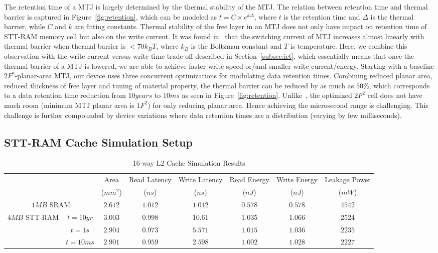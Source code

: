 The retention time of a MTJ is largely determined by the thermal stability of the MTJ. The relation between retention time and thermal barrier is captured in Figure~\ref{fig:retention}, which can be modeled as $t=C\times e^{k\Delta}$, where $t$ is the retention time and $\Delta$ is the thermal barrier, while $C$ and $k$ are fitting constants. Thermal stability of the free layer in an MTJ does not only have impact on retention time of STT-RAM memory cell but also on the write current. It was found in~\cite{PMTJ:Toshiba08} that the switching current of MTJ increases almost linearly with thermal barrier when thermal barrier is $<70k_{B}T$, where $k_{B}$ is the Boltzman constant and $T$ is temperature. Here, we combine this observation with the write current versus write time trade-off described in Section~\ref{subsec:ict}, which essentially means that once the thermal barrier of a MTJ is lowered, we are able to achieve faster write speed or/and smaller write current/energy. Starting with a baseline $2F^2$-planar-area MTJ, our device uses three concurrent optimizations for modulating data retention times. Combining reduced planar area, reduced thickness of free layer and tuning of material property, the thermal barrier can be reduced by as much as $50\%$, which corresponds to a data retention time reduction from $10years$ to $10ms$ as seen in Figure~\ref{fig:retention}. Unlike~\cite{STTRAM:HPCA11}, the optimized $2F^2$ cell does not have much room (minimum MTJ planar area is $1F^2$) for only reducing planar area. Hence achieving the microsecond range is challenging. This challenge is further compounded by device variations where data retention times are a distribution (varying by few milliseconds).

\subsection{STT-RAM Cache Simulation Setup}

\begin{table*}[t]
 \scriptsize
  \centering
  \caption{16-way L2 Cache Simulation Results}
  \label{allcaches}
  \begin{tabular}{| c | c | c | c | c | c | c | c |}
  	\hline\hline
  	\multirow{2}{*}{} & & Area  & Read Latency & Write Latency & Read Energy & Write Energy & Leakage Power\\
  & & ($mm^2$) & ($ns$) & ($ns$) & ($nJ$) & ($nJ$) & ($mW$) \\
  	\hline\hline
  	\multicolumn{2}{|c|}{$1MB$ SRAM} & $2.612$ & $1.012$ & $1.012$ & $0.578$ & $0.578$ & $4542$ \\
  	\hline
  	\multirow{3}{*}{$4MB$ STT-RAM} & $t=10yr$ & $3.003$ & $0.998$ & $10.61$ & $1.035$ & $1.066$ & $2524$ \\
  	& {$t=1s$} & $2.904$ & $0.973$ & $5.571$ & $1.015$ & $1.036$ & $2235$ \\
  	& {$t=10ms$} & $2.901$ & $0.959$ & $2.598$ & $1.002$ & $1.028$ & $2227$ \\	
  	\hline\hline
  \end{tabular}
\end{table*}

